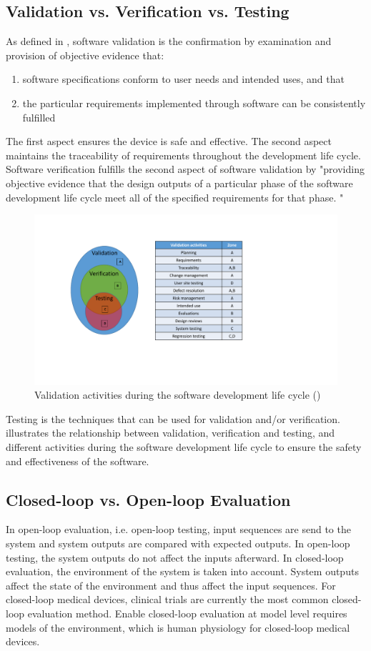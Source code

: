 \subsection{Validation vs. Verification vs. Testing}
As defined in \cite{fda2}, software validation is the confirmation by examination and provision of objective evidence that:
\begin{enumerate}
	\item software specifications conform to user needs and intended uses, and that
	\item the particular requirements implemented through software can be consistently fulfilled
\end{enumerate}
The first aspect ensures the device is safe and effective. The second aspect maintains the traceability of requirements throughout the development life cycle.
Software verification fulfills the second aspect of software validation by "providing objective evidence that the design outputs of a particular phase of the software development life cycle meet all of the specified requirements for that phase. "
\begin{figure}[t]
		\centering
		\includegraphics[width=\textwidth]{figs/validation.pdf}
		\caption{Validation activities during the software development life cycle (\cite{Vogel})}
		\label{fig:validation}
\end{figure}
Testing is the techniques that can be used for validation and/or verification.  illustrates the relationship between validation, verification and testing, and different activities during the software development life cycle to ensure the safety and effectiveness of the software.
\subsection{Closed-loop vs. Open-loop Evaluation}
In open-loop evaluation, i.e. open-loop testing, input sequences are send to the system and system outputs are compared with expected outputs. In open-loop testing, the system outputs do not affect the inputs afterward. In closed-loop evaluation, the environment of the system is taken into account. System outputs affect the state of the environment and thus affect the input sequences. For closed-loop medical devices, clinical trials are currently the most common closed-loop evaluation method. Enable closed-loop evaluation at model level requires models of the environment, which is human physiology for closed-loop medical devices.

